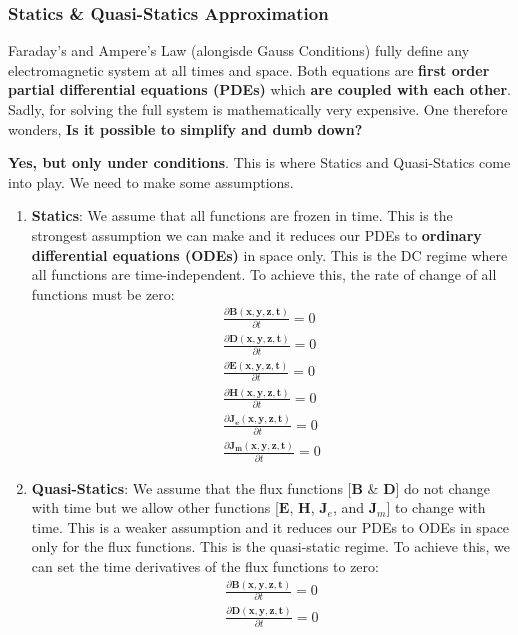 \subsubsection{Statics \& Quasi-Statics Approximation}

Faraday's and Ampere's Law (alongisde Gauss Conditions) fully define any electromagnetic system
at all times and space. Both equations are \textbf{first order partial differential
equations (PDEs)} which \textbf{are coupled with each other}. Sadly, for solving the
full system is mathematically very expensive. One therefore wonders, \textbf{Is it
possible to simplify and dumb down?}


\textbf{Yes, but only under conditions}. This is where Statics and Quasi-Statics
come into play. We need to make some assumptions.
\begin{enumerate}
  \item \textbf{Statics}: We assume that all functions are frozen in time. This is the
    strongest assumption we can make and it reduces our PDEs to \textbf{ordinary
    differential equations (ODEs)} in space only. This is the DC regime where all functions
    are time-independent. To achieve this, the rate of change of all functions must
    be zero:
    \begin{align*}
      \frac{\partial \mathbf{B(x,y,z,t)}}{\partial t} = 0 \\
      \frac{\partial \mathbf{D(x,y,z,t)}}{\partial t} = 0 \\
      \frac{\partial \mathbf{E(x,y,z,t)}}{\partial t} = 0 \\
      \frac{\partial \mathbf{H(x,y,z,t)}}{\partial t} = 0 \\
      \frac{\partial \mathbf{J_e(x,y,z,t)}}{\partial t} = 0 \\
      \frac{\partial \mathbf{J_m(x,y,z,t)}}{\partial t} = 0
    \end{align*}
  \item \textbf{Quasi-Statics}: We assume that the flux functions [\(\mathbf{B}\) \&
    \(\mathbf{D}\)] do not change with time but we allow other functions [\(\mathbf{E}\),
    \(\mathbf{H}\), \(\mathbf{J}_e\), and \(\mathbf{J}_m\)] to change with time. This is
    a weaker assumption and it reduces our PDEs to ODEs in space only for the flux
    functions. This is the quasi-static regime. To achieve this, we can set the time
    derivatives of the flux functions to zero:
    \begin{align*}
      \frac{\partial \mathbf{B(x,y,z,t)}}{\partial t} = 0 \\
      \frac{\partial \mathbf{D(x,y,z,t)}}{\partial t} = 0
    \end{align*}
\end{enumerate}
